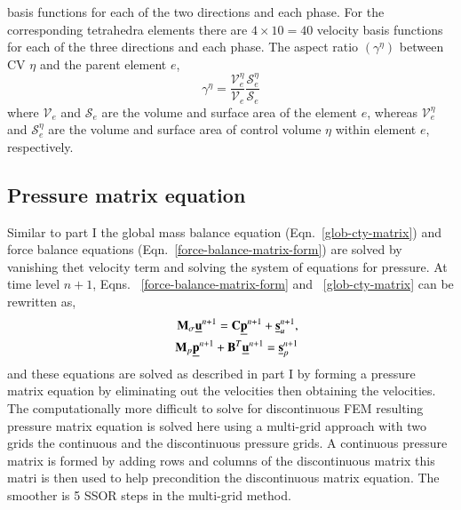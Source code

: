 \documentclass[preprint,authoryear,12pt]{elsarticle}
\begin{document}
{basis functions for each of the two directions and each phase.  For
the corresponding tetrahedra elements there are $4\times 10=40$
velocity basis functions for each of the three directions and each
phase.  The aspect ratio $\left(\gamma^{\eta}\right)$ between CV
$\eta$ and the parent element $e$,
\begin{displaymath}
\gamma^{\eta} =
\displaystyle\frac{\mathcal{V}_{e}^{\eta}}{\mathcal{V}_{e}}
\displaystyle\frac{\mathcal{S}^{\eta}_{e}}{\mathcal{S}_{e}}
\end{displaymath}
where $\mathcal{V}_{e}$ and $\mathcal{S}_{e}$ are the volume and
surface area of the element $e$, whereas $\mathcal{V}_{e}^{\eta}$ and
$\mathcal{S}_{e}^{\eta}$ are the volume and surface area of control
volume $\eta$ within element $e$, respectively.



\subsection{Pressure matrix equation} 
Similar to part I the global mass balance equation (Eqn.~\ref{glob-cty-matrix}) and
force balance equations (Eqn.~\ref{force-balance-matrix-form}) are
solved by vanishing thet velocity term and solving the system of
equations for pressure. At time level $n+1$,
Eqns. ~\ref{force-balance-matrix-form} and ~\ref{glob-cty-matrix} can
be rewritten as,
\begin{eqnarray}
&& \mathbf{M}_{\sigma} \underline{\bf u}^{n+1} = \mathbf{C}\underline{\bf p}^{n+1} + \underline{\bf s}_{u}^{n+1},\label{force-balance-matrix-form2} \\
&& \mathbf{M}_{p} \underline{\bf p}^{n+1} + \mathbf{B}^{T} \underline{\bf u}^{n+1} = \underline{\bf s}_{p}^{n+1}\label{glob-cty-matrix2}
\end{eqnarray}
and these equations are solved as described in part I by forming a pressure 
matrix equation by eliminating out the velocities then obtaining the velocities. 
The computationally more difficult to solve for discontinuous FEM resulting pressure 
matrix equation is solved here using a multi-grid approach with two grids the 
continuous and the discontinuous pressure grids. 
A continuous pressure matrix is formed by adding rows and columns of the discontinuous 
matrix this matri is then used to help precondition the discontinuous matrix 
equation. The smoother is 5 SSOR steps in the multi-grid method. 

 

}
\end{document}
